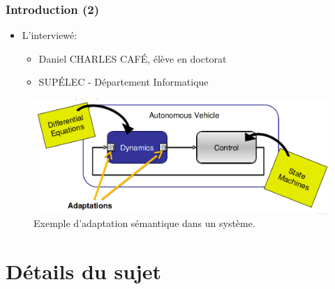 \documentclass[10pt]{beamer}
\begin{document}
\begin{frame}

\frametitle{Introduction (2)}

\begin{itemize}
\item L'interviewé:
	\begin{itemize}
	  \item Daniel CHARLES CAFÉ, élève en doctorat
	  \item SUPÉLEC - Département Informatique 
	\end{itemize}
\end{itemize} 

\begin{figure}[h]
\centering
\includegraphics[scale=0.30]{images/intro}
\caption{Exemple d'adaptation sémantique dans un système.}
\label{fig:intro}
\end{figure}

\end{frame}


\section {Détails du sujet}
\end{document}
